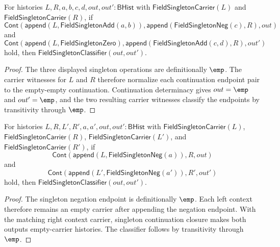 \begin{theorem}
\label{thm:field-singleton-add-neg-zero-context-continuation-classifier}
For histories $L,R,a,b,c,d,out,out':\mathsf{BHist}$ with
$\mathsf{FieldSingletonCarrier}(L)$ and $\mathsf{FieldSingletonCarrier}(R)$,
if
$$
\mathsf{Cont}
  (\mathsf{append}(L,\mathsf{FieldSingletonAdd}(a,b)),
   \mathsf{append}(\mathsf{FieldSingletonNeg}(c),R),out)
$$
and
$$
\mathsf{Cont}
  (\mathsf{append}(L,\mathsf{FieldSingletonZero}),
   \mathsf{append}(\mathsf{FieldSingletonAdd}(c,d),R),out')
$$
hold, then $\mathsf{FieldSingletonClassifier}(out,out')$.
\end{theorem}
\begin{proof}
The three displayed singleton operations are definitionally $\emp$. The
carrier witnesses for $L$ and $R$ therefore normalize each continuation
endpoint pair to the empty-empty continuation. Continuation determinacy gives
$out=\emp$ and $out'=\emp$, and the two resulting carrier witnesses classify
the endpoints by transitivity through $\emp$.
\end{proof}

\begin{theorem}
\label{thm:field-singleton-neg-context-continuation-classifier}
For histories $L,R,L',R',a,a',out,out':\mathsf{BHist}$ with
$\mathsf{FieldSingletonCarrier}(L)$, $\mathsf{FieldSingletonCarrier}(R)$,
$\mathsf{FieldSingletonCarrier}(L')$, and
$\mathsf{FieldSingletonCarrier}(R')$, if
$$
\mathsf{Cont}(\mathsf{append}(L,\mathsf{FieldSingletonNeg}(a)),R,out)
$$
and
$$
\mathsf{Cont}(\mathsf{append}(L',\mathsf{FieldSingletonNeg}(a')),R',out')
$$
hold, then $\mathsf{FieldSingletonClassifier}(out,out')$.
\end{theorem}
\begin{proof}
The singleton negation endpoint is definitionally $\emp$. Each left context
therefore remains an empty carrier after appending the negation endpoint. With
the matching right context carrier, singleton continuation closure makes both
outputs empty-carrier histories. The classifier follows by transitivity through
$\emp$.
\end{proof}

